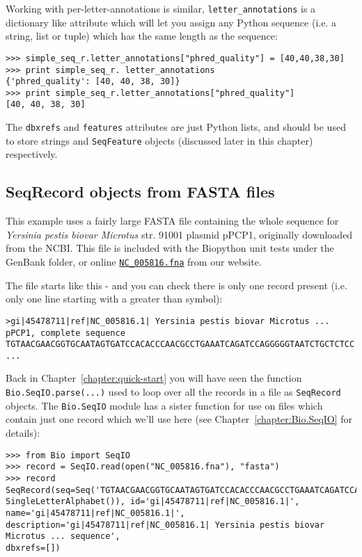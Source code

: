 \documentclass{report}
\begin{document}
Working with per-letter-annotations is similar, \verb|letter_annotations| is a
dictionary like attribute which will let you assign any Python sequence (i.e.
a string, list or tuple) which has the same length as the sequence:

\begin{verbatim}
>>> simple_seq_r.letter_annotations["phred_quality"] = [40,40,38,30]
>>> print simple_seq_r. letter_annotations
{'phred_quality': [40, 40, 38, 30]}
>>> print simple_seq_r.letter_annotations["phred_quality"]
[40, 40, 38, 30]
\end{verbatim}

The \verb|dbxrefs| and \verb|features| attributes are just Python lists, and
should be used to store strings and \verb|SeqFeature| objects (discussed later
in this chapter) respectively.


\subsection{SeqRecord objects from FASTA files}

This example uses a fairly large FASTA file containing the whole sequence for \textit{Yersinia pestis biovar Microtus} str. 91001 plasmid pPCP1, originally downloaded from the NCBI.  This file is included with the Biopython unit tests under the GenBank folder, or online \href{http://biopython.org/SRC/biopython/Tests/GenBank/NC_005816.fna}{\texttt{NC\_005816.fna}} from our website.

The file starts like this - and you can check there is only one record present (i.e. only one line starting with a greater than symbol):

\begin{verbatim}
>gi|45478711|ref|NC_005816.1| Yersinia pestis biovar Microtus ... pPCP1, complete sequence
TGTAACGAACGGTGCAATAGTGATCCACACCCAACGCCTGAAATCAGATCCAGGGGGTAATCTGCTCTCC
...
\end{verbatim}

Back in Chapter~\ref{chapter:quick-start} you will have seen the function \verb|Bio.SeqIO.parse(...)|
used to loop over all the records in a file as \verb|SeqRecord| objects. The \verb|Bio.SeqIO| module
has a sister function for use on files which contain just one record which we'll use here (see Chapter~\ref{chapter:Bio.SeqIO} for details):

\begin{verbatim}
>>> from Bio import SeqIO
>>> record = SeqIO.read(open("NC_005816.fna"), "fasta")
>>> record
SeqRecord(seq=Seq('TGTAACGAACGGTGCAATAGTGATCCACACCCAACGCCTGAAATCAGATCCAGG...CTG',
SingleLetterAlphabet()), id='gi|45478711|ref|NC_005816.1|', name='gi|45478711|ref|NC_005816.1|',
description='gi|45478711|ref|NC_005816.1| Yersinia pestis biovar Microtus ... sequence',
dbxrefs=[])
\end{verbatim}
\end{document}
